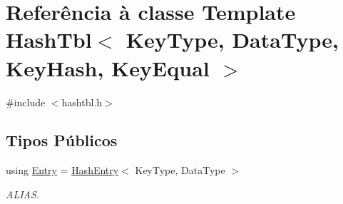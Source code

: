 \hypertarget{classHashTbl}{}\section{Referência à classe Template Hash\+Tbl$<$ Key\+Type, Data\+Type, Key\+Hash, Key\+Equal $>$}
\label{classHashTbl}


{\ttfamily \#include $<$hashtbl.\+h$>$}

\subsection*{Tipos Públicos}
\begin{DoxyCompactItemize}
\item 
using \hyperlink{classHashTbl_ab9ca4e5818aa21557c7cedaf02a1e7db}{Entry} = \hyperlink{classHashEntry}{Hash\+Entry}$<$ Key\+Type, Data\+Type $>$
\begin{DoxyCompactList}\small\item\em A\+L\+I\+AS. \end{DoxyCompactList}\end{DoxyCompactItemize}
